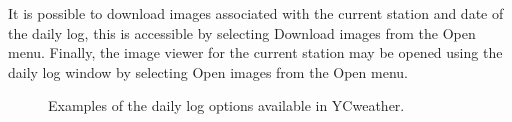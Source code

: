 It is possible to download images associated with the current station and date of the daily log, this is accessible by selecting Download images from the Open menu.  Finally, the image viewer for the current station may be opened using the daily log window by selecting Open images from the Open menu.

\begin{figure}[ht!]
	\quad
	\caption{Examples of the daily log options available in YCweather.}
	\label{fig:exlog}
\end{figure}
